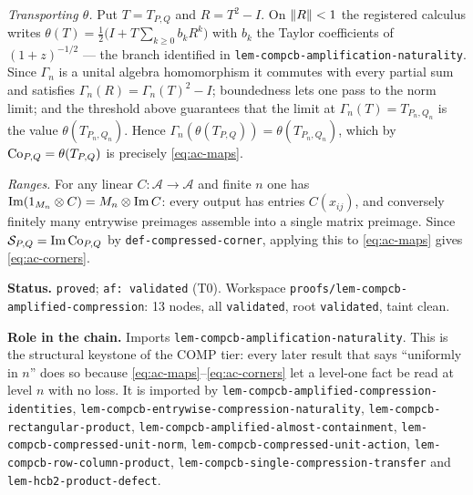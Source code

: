 \emph{Transporting $\theta$.} Put $T=T_{P,Q}$ and $R=T^2-I$. On $\lVert R\rVert<1$ the
registered calculus writes $\theta(T)=\tfrac12\bigl(I+T\sum_{k\ge0}b_kR^{k}\bigr)$ with
$b_k$ the Taylor coefficients of $(1+z)^{-1/2}$ --- the branch identified in
\texttt{lem-compcb-amplification-naturality}. Since $\Gamma_n$ is a unital algebra
homomorphism it commutes with every partial sum and satisfies
$\Gamma_n(R)=\Gamma_n(T)^2-I$; boundedness lets one pass to the norm limit; and the
threshold above guarantees that the limit at $\Gamma_n(T)=T_{P_n,Q_n}$ is the value
$\theta(T_{P_n,Q_n})$. Hence
$\Gamma_n(\theta(T_{P,Q}))=\theta(T_{P_n,Q_n})$, which by
$\mathrm{Co}_{P,Q}=\theta(T_{P,Q})$ is precisely \eqref{eq:ac-maps}.

\emph{Ranges.} For any linear $C:\mathcal A\to\mathcal A$ and finite $n$ one has
$\operatorname{Im}(1_{M_{n}}\otimes C)=M_{n}\otimes \operatorname{Im} C$: every output has entries $C(x_{ij})$, and conversely
finitely many entrywise preimages assemble into a single matrix preimage. Since
$\mathcal S_{P,Q}=\operatorname{Im}\mathrm{Co}_{P,Q}$ by \texttt{def-compressed-corner}, applying this to
\eqref{eq:ac-maps} gives \eqref{eq:ac-corners}.

\medskip
\noindent\textbf{Status.} \texttt{proved}; \texttt{af: validated} (T0). Workspace
\texttt{proofs/lem-compcb-amplified-compression}: 13 nodes, all \texttt{validated}, root
\texttt{validated}, taint clean.

\noindent\textbf{Role in the chain.} Imports
\texttt{lem-compcb-amplification-naturality}. This is the structural keystone of the COMP
tier: every later result that says ``uniformly in $n$'' does so because
\eqref{eq:ac-maps}--\eqref{eq:ac-corners} let a level-one fact be read at level $n$ with
no loss. It is imported by \texttt{lem-compcb-amplified-compression-identities},
\texttt{lem-compcb-entrywise-compression-naturality},
\texttt{lem-compcb-rectangular-product},
\texttt{lem-compcb-amplified-almost-containment},
\texttt{lem-compcb-compressed-unit-norm},
\texttt{lem-compcb-compressed-unit-action},
\texttt{lem-compcb-row-column-product},
\texttt{lem-compcb-single-compression-transfer} and
\texttt{lem-hcb2-product-defect}.
